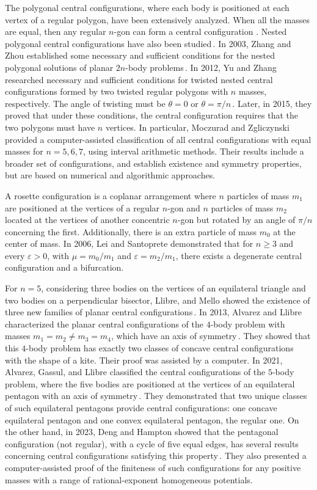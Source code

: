 \documentclass[final,11pt]{article}
\numberwithin{equation}{section}
\theoremstyle{definition}
\begin{document}
The polygonal central configurations, where each body is positioned at each vertex of a regular polygon, have been extensively analyzed. When all the masses are equal, then any regular $n$-gon can form a central configuration \cite{MR3469182}. Nested polygonal central configurations have also been studied\,. In 2003, Zhang and Zhou \cite{MR1963764} established some necessary and sufficient conditions for the nested polygonal solutions of planar $2n$-body problems\,. In 2012, Yu and Zhang  \cite{MR2946965} researched necessary and sufficient conditions for twisted nested central configurations formed by two twisted regular polygons with $n$ masses, respectively. The angle of twisting must be $\theta=0$ or $\theta=\pi/n$\,. Later, in 2015, they proved \cite{MR3297886} that under these conditions, the central configuration requires that the two polygons must have $n$ vertices.
In particular, Moczurad and Zgliczynski \cite{MR4017363} provided a computer-assisted classification of all central configurations with equal masses for 
$n=5,6,7$, using interval arithmetic methods. Their results include a broader set of configurations, and establish existence and symmetry properties, but are based on numerical and algorithmic approaches.

A rosette configuration is a coplanar arrangement where $n$ particles of mass $m_{1}$ are positioned at the vertices of a regular $n$-gon and $n$ particles of mass $m_{2}$ located at the vertices of another concentric $n$-gon but rotated by an angle of $\pi/n$ concerning the first. Additionally, there is an extra particle of mass $m_{0}$ at the center of mass. In 2006, Lei and Santoprete \cite{MR2247661} demonstrated that for $n \geq 3$ and every $\varepsilon>0$, with $\mu=m_0/m_1$ and $\varepsilon=m_2/m_1$, there exists a degenerate central configuration and a bifurcation.

For $n=5$, considering three bodies on the vertices of an equilateral triangle and two bodies on a perpendicular bisector, Llibre, and Mello \cite{Llibre:2008aa} showed the existence of three new families of planar central configurations\,. In 2013, Alvarez and Llibre \cite{MR3018443} characterized the planar central configurations of the $4$-body problem with masses $m_{1}=m_{2}\neq m_{3}=m_{4}$, which have an axis of symmetry\,. They showed that this $4$-body problem has exactly two classes of concave central configurations with the shape of a kite. Their proof was assisted by a computer. In 2021, Alvarez, Gassul, and Llibre \cite{MR4418916} classified the central configurations of the $5$-body problem, where the five bodies are positioned at the vertices of an equilateral pentagon with an axis of symmetry\,. They demonstrated that two unique classes of such equilateral pentagons provide central configurations: one concave equilateral pentagon and one convex equilateral pentagon, the regular one. On the other hand, in 2023, Deng and Hampton \cite{MR4502734} showed that the pentagonal configuration (not regular), with a cycle of five equal edges, has several results concerning central configurations satisfying this property\,. They also presented a computer-assisted proof of the finiteness of such configurations for any positive masses with a range of rational-exponent homogeneous potentials.
\end{document}
